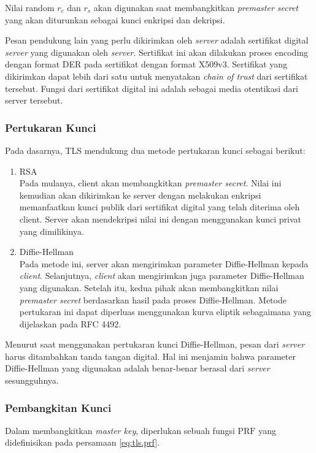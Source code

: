 Nilai random $r_c$ dan $r_s$ akan digunakan saat membangkitkan \emph{premaster secret} yang akan diturunkan sebagai kunci enkripsi dan dekripsi.

Pesan pendukung lain yang perlu dikirimkan oleh \emph{server} adalah sertifikat digital \emph{server} yang digunakan oleh \emph{server}. Sertifikat ini akan dilakukan proses encoding dengan format DER pada sertifikat dengan format X509v3. Sertifikat yang dikirimkan dapat lebih dari satu untuk menyatakan \emph{chain of trust} dari sertifikat tersebut. Fungsi dari sertifikat digital ini adalah sebagai media otentikasi dari server tersebut.


\subsubsection{Pertukaran Kunci}
\label{sec:tls.keyexchange}

Pada dasarnya, TLS mendukung dua metode pertukaran kunci sebagai berikut:
\begin{enumerate}
  \item RSA\\
  Pada mulanya, client akan membangkitkan \emph{premaster secret}. Nilai ini kemudian akan dikirimkan ke server dengan melakukan enkripsi memanfaatkan kunci publik dari sertifikat digital yang telah diterima oleh client. Server akan mendekripsi nilai ini dengan menggunakan kunci privat yang dimilikinya.

  \item Diffie-Hellman\\
  Pada metode ini, server akan mengirimkan parameter Diffie-Hellman kepada \emph{client}. Selanjutnya, \emph{client} akan mengirimkan juga parameter Diffie-Hellman yang digunakan. Setelah itu, kedua pihak akan membangkitkan nilai \emph{premaster secret} berdasarkan hasil pada proses Diffie-Hellman. Metode pertukaran ini dapat diperluas menggunakan kurva eliptik sebagaimana yang dijelaskan pada RFC 4492. 
\end{enumerate}

Menurut \textcite{rfc5246} saat menggunakan pertukaran kunci Diffie-Hellman, pesan dari \emph{server} harus ditambahkan tanda tangan digital. Hal ini menjamin bahwa parameter Diffie-Hellman yang digunakan adalah benar-benar berasal dari \emph{server} sesungguhnya. 

\subsubsection{Pembangkitan Kunci}
Dalam membangkitkan \emph{master key}, diperlukan sebuah fungsi $\text{PRF}$ yang didefinisikan pada persamaan \ref{eq:tls.prf}.

